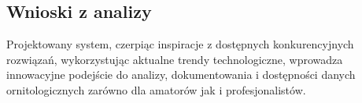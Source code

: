 \subsection{Wnioski z analizy}

Projektowany system, czerpiąc inspiracje z dostępnych konkurencyjnych rozwiązań, wykorzystując aktualne trendy technologiczne, wprowadza innowacyjne podejście do analizy, dokumentowania i dostępności danych ornitologicznych zarówno dla amatorów jak i profesjonalistów.
